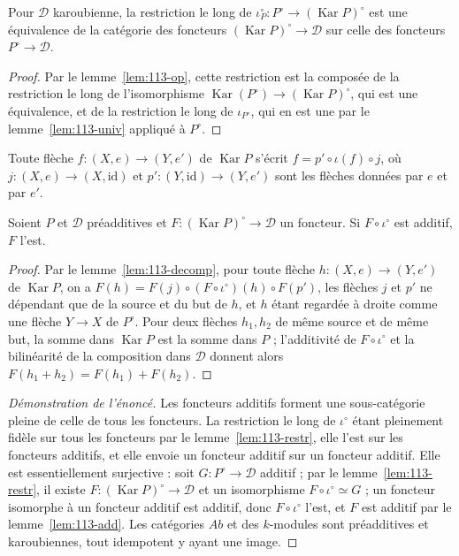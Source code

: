 \begin{lemme}\label{lem:113-restr}
Pour $\mathcal D$ karoubienne, la restriction le long de $\iota_P^\circ : P^\circ \to (\operatorname{Kar} P)^\circ$ est une équivalence de la catégorie des foncteurs $(\operatorname{Kar} P)^\circ \to \mathcal D$ sur celle des foncteurs $P^\circ \to \mathcal D$.
\end{lemme}

\begin{proof}
Par le lemme~\ref{lem:113-op}, cette restriction est la composée de la restriction le long de l'isomorphisme $\operatorname{Kar}(P^\circ) \to (\operatorname{Kar} P)^\circ$, qui est une équivalence, et de la restriction le long de $\iota_{P^\circ}$, qui en est une par le lemme~\ref{lem:113-univ} appliqué à $P^\circ$.
\end{proof}

\begin{lemme}\label{lem:113-decomp}
Toute flèche $f : (X, e) \to (Y, e')$ de $\operatorname{Kar} P$ s'écrit $f = p' \circ \iota(f) \circ j$, où $j : (X, e) \to (X, \mathrm{id})$ et $p' : (Y, \mathrm{id}) \to (Y, e')$ sont les flèches données par $e$ et par $e'$.
\end{lemme}


\begin{lemme}\label{lem:113-add}
Soient $P$ et $\mathcal D$ préadditives et $F : (\operatorname{Kar} P)^\circ \to \mathcal D$ un foncteur. Si $F \circ \iota^\circ$ est additif, $F$ l'est.
\end{lemme}

\begin{proof}
Par le lemme~\ref{lem:113-decomp}, pour toute flèche $h : (X, e) \to (Y, e')$ de $\operatorname{Kar} P$, on a $F(h) = F(j) \circ (F \circ \iota^\circ)(h) \circ F(p')$, les flèches $j$ et $p'$ ne dépendant que de la source et du but de $h$, et $h$ étant regardée à droite comme une flèche $Y \to X$ de $P^\circ$. Pour deux flèches $h_1, h_2$ de même source et de même but, la somme dans $\operatorname{Kar} P$ est la somme dans $P$ ; l'additivité de $F \circ \iota^\circ$ et la bilinéarité de la composition dans $\mathcal D$ donnent alors $F(h_1 + h_2) = F(h_1) + F(h_2)$.
\end{proof}

\begin{proof}[Démonstration de l'énoncé]
Les foncteurs additifs forment une sous-catégorie pleine de celle de tous les foncteurs. La restriction le long de $\iota^\circ$ étant pleinement fidèle sur tous les foncteurs par le lemme~\ref{lem:113-restr}, elle l'est sur les foncteurs additifs, et elle envoie un foncteur additif sur un foncteur additif. Elle est essentiellement surjective : soit $G : P^\circ \to \mathcal D$ additif ; par le lemme~\ref{lem:113-restr}, il existe $F : (\operatorname{Kar} P)^\circ \to \mathcal D$ et un isomorphisme $F \circ \iota^\circ \simeq G$ ; un foncteur isomorphe à un foncteur additif est additif, donc $F \circ \iota^\circ$ l'est, et $F$ est additif par le lemme~\ref{lem:113-add}. Les catégories $Ab$ et des $k$-modules sont préadditives et karoubiennes, tout idempotent y ayant une image.
\end{proof}

